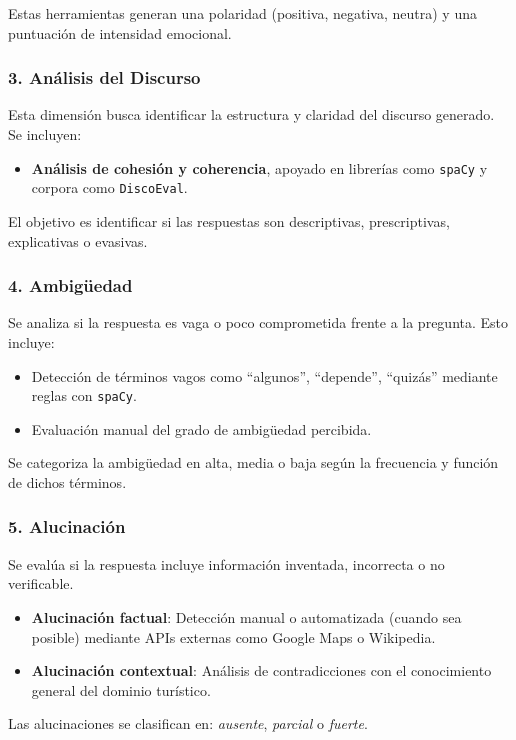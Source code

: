 \documentclass[10pt]{article}
\begin{document}
Estas herramientas generan una polaridad (positiva, negativa, neutra) y una puntuación de intensidad emocional.

\subsubsection*{3. Análisis del Discurso}

Esta dimensión busca identificar la estructura y claridad del discurso generado. Se incluyen:

\begin{itemize}
    \item \textbf{Análisis de cohesión y coherencia}, apoyado en librerías como \texttt{spaCy} y corpora como \texttt{DiscoEval}.
\end{itemize}

El objetivo es identificar si las respuestas son descriptivas, prescriptivas, explicativas o evasivas.

\subsubsection*{4. Ambigüedad}

Se analiza si la respuesta es vaga o poco comprometida frente a la pregunta. Esto incluye:

\begin{itemize}
    \item Detección de términos vagos como ``algunos'', ``depende'', ``quizás'' mediante reglas con \texttt{spaCy}.
    \item Evaluación manual del grado de ambigüedad percibida.
\end{itemize}

Se categoriza la ambigüedad en alta, media o baja según la frecuencia y función de dichos términos.

\subsubsection*{5. Alucinación}

Se evalúa si la respuesta incluye información inventada, incorrecta o no verificable.

\begin{itemize}
    \item \textbf{Alucinación factual}: Detección manual o automatizada (cuando sea posible) mediante APIs externas como Google Maps o Wikipedia.
    \item \textbf{Alucinación contextual}: Análisis de contradicciones con el conocimiento general del dominio turístico.
\end{itemize}

Las alucinaciones se clasifican en: \emph{ausente}, \emph{parcial} o \emph{fuerte}.
\end{document}

